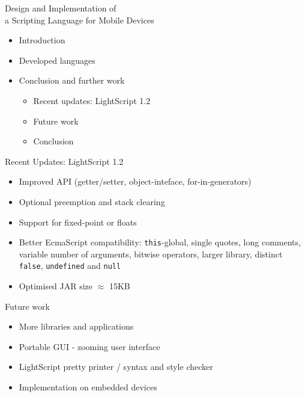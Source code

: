 \documentclass[a4paper,landscape]{slides}
\begin{document}
\begin{slide}
        {\large Design and Implementation of \\ a Scripting Language for Mobile Devices \\ \mbox{}}
\begin{itemize}\addtolength{\itemsep}{-\baselineskip}
\item Introduction 
\item Developed languages 
\item Conclusion and further work 
        \begin{itemize}
            \item Recent updates: LightScript 1.2 
            \item Future work
            \item Conclusion 
        \end{itemize}
\end{itemize}
\end{slide}
\begin{slide}
	{\large 
            Recent Updates: LightScript 1.2
	\\ \mbox{}}
	\begin{itemize} \addtolength{\itemsep}{-\baselineskip}
            \item Improved API (getter/setter, object-inteface, for-in-generators)
            \item Optional preemption and stack clearing
            \item Support for fixed-point or floats
            \item Better EcmaScript compatibility: \verb|this|-global, single quotes, long comments, variable number of arguments, bitwise operators, larger library, distinct \verb|false|, \verb|undefined| and \verb|null|
            \item Optimised JAR size $\approx$ 15KB
	\end{itemize}
\end{slide}
\begin{slide}
	{\large 
            Future work
	\\ \mbox{}}
	\begin{itemize}
            \item More libraries and applications
            \item Portable GUI - zooming user interface
            \item LightScript pretty printer / syntax and style checker
            \item Implementation on embedded devices
	\end{itemize}
\end{slide}
\end{document}
